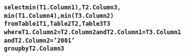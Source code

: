 \begin{figure}[t]
\begin{CodeOut}
\begin{alltt}
\textbf{select min(T1.Column1), T2.Column3,
       min(T1.Column4), min(T3.Column2)
from Table1 T1, Table2 T2, Table3 T3
where T1.Column2 = T2.Column2 and T2.Column1 = T3.Column1
       and T2.Column2 = '2001'
group by T2.Column3}
\end{alltt}
\end{CodeOut}
\vspace{-5mm}
\end{figure}
